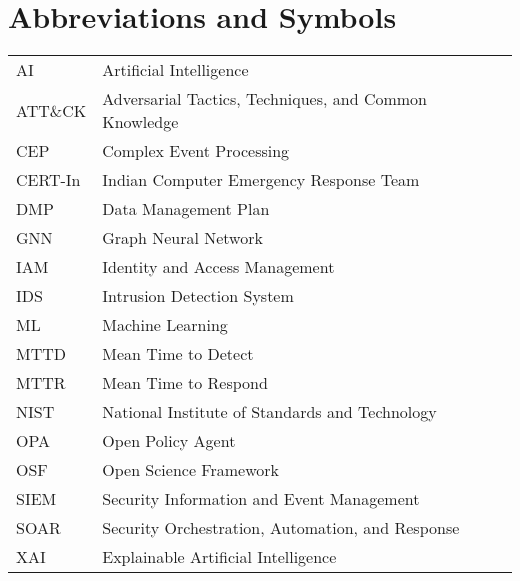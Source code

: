 \chapter*{Abbreviations and Symbols}
\begin{longtable}{ll}
AI & Artificial Intelligence \\
ATT\&CK & Adversarial Tactics, Techniques, and Common Knowledge \\
CEP & Complex Event Processing \\
CERT-In & Indian Computer Emergency Response Team \\
DMP & Data Management Plan \\
GNN & Graph Neural Network \\
IAM & Identity and Access Management \\
IDS & Intrusion Detection System \\
ML & Machine Learning \\
MTTD & Mean Time to Detect \\
MTTR & Mean Time to Respond \\
NIST & National Institute of Standards and Technology \\
OPA & Open Policy Agent \\
OSF & Open Science Framework \\
SIEM & Security Information and Event Management \\
SOAR & Security Orchestration, Automation, and Response \\
XAI & Explainable Artificial Intelligence \\
\end{longtable}
\cleardoublepage
